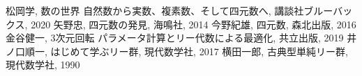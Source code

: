 \documentclass{jlreq}
\numberwithin{equation}{section}
\begin{document}
\begin{thebibliography}{99}
     松岡学, 数の世界 自然数から実数、複素数、そして四元数へ, 講談社ブルーバックス, 2020
     矢野忠, 四元数の発見, 海鳴社, 2014
     今野紀雄, 四元数, 森北出版, 2016
     金谷健一, 3次元回転 パラメータ計算とリー代数による最適化, 共立出版, 2019
     井ノ口順一, はじめて学ぶリー群, 現代数学社, 2017
     横田一郎, 古典型単純リー群, 現代数学社, 1990
\end{thebibliography}
\end{document}
